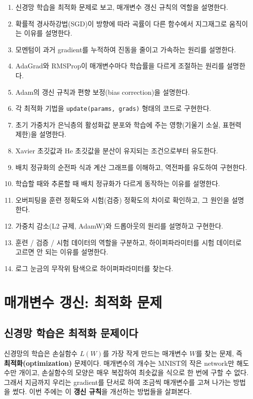 \documentclass[11pt,a4paper]{article}
\begin{document}
\begin{enumerate}[label=\arabic*.]
\item 신경망 학습을 최적화 문제로 보고, 매개변수 갱신 규칙의 역할을 설명한다.
\item 확률적 경사하강법(SGD)이 방향에 따라 곡률이 다른 함수에서 지그재그로 움직이는 이유를 설명한다.
\item 모멘텀이 과거 gradient를 누적하여 진동을 줄이고 가속하는 원리를 설명한다.
\item AdaGrad와 RMSProp이 매개변수마다 학습률을 다르게 조절하는 원리를 설명한다.
\item Adam의 갱신 규칙과 편향 보정(bias correction)을 설명한다.
\item 각 최적화 기법을 \texttt{update(params, grads)} 형태의 코드로 구현한다.
\item 초기 가중치가 은닉층의 활성화값 분포와 학습에 주는 영향(기울기 소실, 표현력 제한)을 설명한다.
\item Xavier 초깃값과 He 초깃값을 분산이 유지되는 조건으로부터 유도한다.
\item 배치 정규화의 순전파 식과 계산 그래프를 이해하고, 역전파를 유도하여 구현한다.
\item 학습할 때와 추론할 때 배치 정규화가 다르게 동작하는 이유를 설명한다.
\item 오버피팅을 훈련 정확도와 시험(검증) 정확도의 차이로 확인하고, 그 원인을 설명한다.
\item 가중치 감소(L2 규제, AdamW)와 드롭아웃의 원리를 설명하고 구현한다.
\item 훈련 / 검증 / 시험 데이터의 역할을 구분하고, 하이퍼파라미터를 시험 데이터로 고르면 안 되는 이유를 설명한다.
\item 로그 눈금의 무작위 탐색으로 하이퍼파라미터를 찾는다.
\end{enumerate}

\section{매개변수 갱신: 최적화 문제}

\subsection{신경망 학습은 최적화 문제이다}

신경망의 학습은 손실함수 $L(W)$를 가장 작게 만드는 매개변수 $W$를 찾는 문제,
즉 \textbf{최적화(optimization)} 문제이다.
매개변수의 개수는 MNIST의 작은 network만 해도 수만 개이고, 손실함수의 모양은 매우 복잡하여
최솟값을 식으로 한 번에 구할 수 없다.
그래서 지금까지 우리는 gradient를 단서로 하여 조금씩 매개변수를 고쳐 나가는 방법을 썼다.
이번 주에는 이 \textbf{갱신 규칙}을 개선하는 방법들을 살펴본다.
\end{document}
